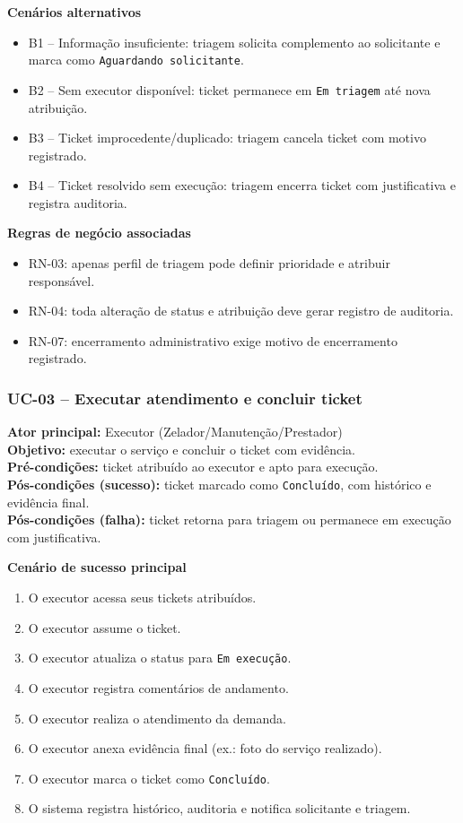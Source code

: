\documentclass[12pt,a4paper]{article}
\begin{document}
\textbf{Cenários alternativos}
\begin{itemize}
    \item B1 -- Informação insuficiente: triagem solicita complemento ao solicitante e marca como \texttt{Aguardando solicitante}.
    \item B2 -- Sem executor disponível: ticket permanece em \texttt{Em triagem} até nova atribuição.
    \item B3 -- Ticket improcedente/duplicado: triagem cancela ticket com motivo registrado.
    \item B4 -- Ticket resolvido sem execução: triagem encerra ticket com justificativa e registra auditoria.
\end{itemize}

\textbf{Regras de negócio associadas}
\begin{itemize}
    \item RN-03: apenas perfil de triagem pode definir prioridade e atribuir responsável.
    \item RN-04: toda alteração de status e atribuição deve gerar registro de auditoria.
    \item RN-07: encerramento administrativo exige motivo de encerramento registrado.
\end{itemize}

\subsubsection{UC-03 -- Executar atendimento e concluir ticket}

\textbf{Ator principal:} Executor (Zelador/Manutenção/Prestador) \\
\textbf{Objetivo:} executar o serviço e concluir o ticket com evidência. \\
\textbf{Pré-condições:} ticket atribuído ao executor e apto para execução. \\
\textbf{Pós-condições (sucesso):} ticket marcado como \texttt{Concluído}, com histórico e evidência final. \\
\textbf{Pós-condições (falha):} ticket retorna para triagem ou permanece em execução com justificativa.

\textbf{Cenário de sucesso principal}
\begin{enumerate}
    \item O executor acessa seus tickets atribuídos.
    \item O executor assume o ticket.
    \item O executor atualiza o status para \texttt{Em execução}.
    \item O executor registra comentários de andamento.
    \item O executor realiza o atendimento da demanda.
    \item O executor anexa evidência final (ex.: foto do serviço realizado).
    \item O executor marca o ticket como \texttt{Concluído}.
    \item O sistema registra histórico, auditoria e notifica solicitante e triagem.
\end{enumerate}
\end{document}
